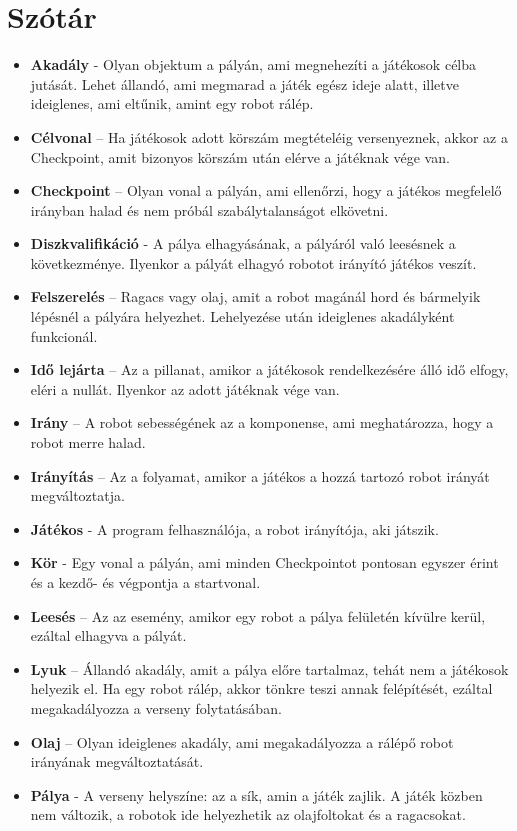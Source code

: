 \section{Szótár}
\begin{itemize}
\item \textbf{Akadály} - Olyan objektum a pályán, ami megnehezíti a játékosok célba jutását. Lehet állandó, ami megmarad a játék egész ideje alatt, illetve ideiglenes, ami eltűnik, amint egy robot rálép.
\item \textbf{Célvonal} – Ha játékosok adott körszám megtételéig versenyeznek, akkor az a Checkpoint, amit bizonyos körszám után elérve a játéknak vége van.
\item \textbf{Checkpoint} – Olyan vonal a pályán, ami ellenőrzi, hogy a játékos megfelelő irányban halad és nem próbál szabálytalanságot elkövetni.
\item \textbf{Diszkvalifikáció} - A pálya elhagyásának, a pályáról való leesésnek a következménye. Ilyenkor a pályát elhagyó robotot irányító játékos veszít.
\item \textbf{Felszerelés} – Ragacs vagy olaj, amit a robot magánál hord és bármelyik lépésnél a pályára helyezhet. Lehelyezése után ideiglenes akadályként funkcionál.
\item \textbf{Idő lejárta} – Az a pillanat, amikor a játékosok rendelkezésére álló idő elfogy, eléri a nullát. Ilyenkor az adott játéknak vége van.
\item \textbf{Irány} – A robot sebességének az a komponense, ami meghatározza, hogy a robot merre halad.
\item \textbf{Irányítás} – Az a folyamat, amikor a játékos a hozzá tartozó robot irányát megváltoztatja.
\item \textbf{Játékos} - A program felhasználója, a robot irányítója, aki játszik.
\item \textbf{Kör} - Egy vonal a pályán, ami minden Checkpointot pontosan egyszer érint és a kezdő- és végpontja a startvonal.
\item \textbf{Leesés} – Az az esemény, amikor egy robot a pálya felületén kívülre kerül, ezáltal elhagyva a pályát. 
\item \textbf{Lyuk} – Állandó akadály, amit a pálya előre tartalmaz, tehát nem a játékosok helyezik el. Ha egy robot rálép, akkor tönkre teszi annak felépítését, ezáltal megakadályozza a verseny folytatásában.
\item \textbf{Olaj} – Olyan ideiglenes akadály, ami megakadályozza a rálépő robot irányának megváltoztatását.
\item \textbf{Pálya} - A verseny helyszíne: az a sík, amin a játék zajlik. A játék közben nem változik, a robotok ide helyezhetik az olajfoltokat és a ragacsokat.

\end{itemize}
